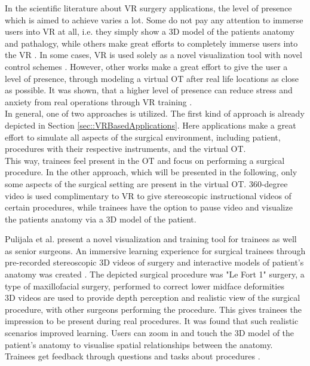 In the scientific literature about VR surgery applications, the level of presence which is aimed to achieve varies a lot.
Some do not pay any attention to immerse users into VR at all, i.e. they simply show a 3D model of the patients anatomy and 
pathalogy, while others make great efforts to completely immerse users into the VR \cite{Vaughan.2016}.
In some cases, VR is used solely as a novel visualization tool with novel control schemes \cite{.2017}.
However, other works make a great effort to give the user a level of presence, through modeling a virtual OT after real life locations as close as possible.
It was shown, that a higher level of presence can reduce stress and anxiety from real operations through VR training \cite{Pulijala.2017,Pulijala.2018,Pulijala.2018b}.
\\ In general, one of two approaches is utilized.
The first kind of approach is already depicted in Section \ref{sec::VRBasedApplications}.
Here applications make a great effort to simulate all aspects of the surgical environment, including patient, procedures with their respective instruments, and the virtual OT.
\\ This way, trainees feel present in the OT and focus on performing a surgical procedure.
In the other approach, which will be presented in the following, only some aspects of the surgical setting are present in the virtual OT.
360-degree video is used complimentary to VR to give stereoscopic instructional videos of certain procedures, while trainees have the option to pause video 
and visualize the patients anatomy via a 3D model of the patient.

Pulijala et al. \cite{Pulijala.2017} present a novel visualization and training tool for trainees as well as senior surgeons.
An immersive learning experience for surgical trainees through pre-recorded stereoscopic 3D videos of surgery and interactive models of patient’s anatomy was created \cite{Pulijala.2017}.
The depicted surgical procedure was "Le Fort 1" surgery, a type of maxillofacial surgery, performed to correct lower midface deformities \cite{Pulijala.2017}
\\ 3D videos are used to provide depth perception and realistic view of the surgical procedure, with other surgeons performing the procedure.
This gives trainees the impression to be present during real procedures.
It was found that such realistic scenarios improved learning.
Users can zoom in and touch the 3D model of the patient's anatomy to visualise spatial relationships between the anatomy.
Trainees get feedback through questions and tasks about procedures \cite{Pulijala.2017,Pulijala.2018}.

